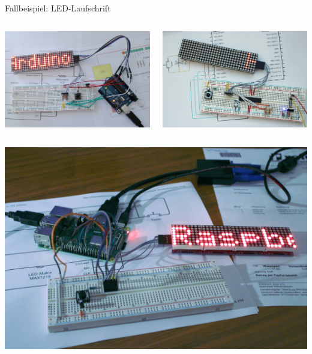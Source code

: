 \begin{frame}{Fallbeispiel: LED-Laufschrift}
    \begin{columns}
        \includegraphics[width=\textwidth]{img/laufschrift_arduino1}

        \includegraphics[width=\textwidth]{img/laufschrift_arduino2}
    \end{columns}

    \bigskip

    \begin{columns}
        \includegraphics[width=\textwidth]{img/laufschrift_pi1}


\end{columns}
\end{frame}
